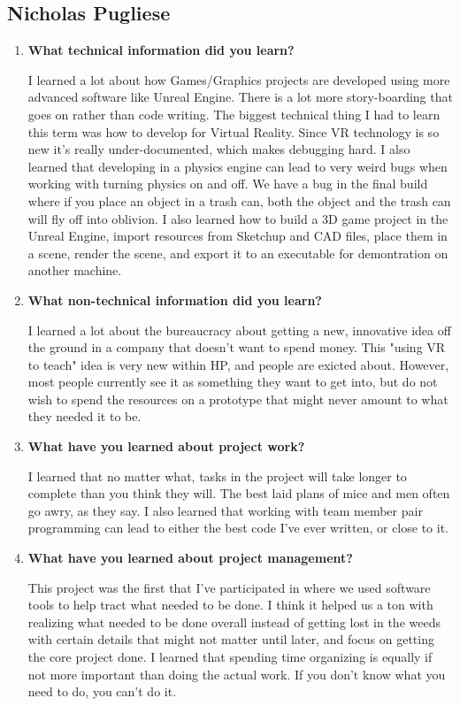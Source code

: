 \documentclass[onecolumn, draftclsnofoot,10pt, compsoc]{IEEEtran}
\begin{document}
\subsection{Nicholas Pugliese}
\begin{enumerate}
    \item \textbf{What technical information did you learn?}
    
    I learned a lot about how Games/Graphics projects are developed using more advanced software like Unreal Engine. There is a lot more story-boarding that goes on rather than code writing. The biggest technical thing I had to learn this term was how to develop for Virtual Reality. Since VR technology is so new it's really under-documented, which makes debugging hard. I also learned that developing in a physics engine can lead to very weird bugs when working with turning physics on and off. We have a bug in the final build where if you place an object in a trash can, both the object and the trash can will fly off into oblivion. I also learned how to build a 3D game project in the Unreal Engine, import resources from Sketchup and CAD files, place them in a scene, render the scene, and export it to an executable for demontration on another machine.
    
    \item \textbf{What non-technical information did you learn?}
    
    I learned a lot about the bureaucracy about getting a new, innovative idea off the ground in a company that doesn't want to spend money. This "using VR to teach" idea is very new within HP, and people are exicted about. However, most people currently see it as something they want to get into, but do not wish to spend the resources on a prototype that might never amount to what they needed it to be.
    
    \item \textbf{What have you learned about project work?}
    
    I learned that no matter what, tasks in the project will take longer to complete than you think they will. The best laid plans of mice and men often go awry, as they say. I also learned that working with team member pair programming can lead to either the best code I've ever written, or close to it.
    
    \item \textbf{What have you learned about project management?}
    
    This project was the first that I've participated in where we used software tools to help tract what needed to be done. I think it helped us a ton with realizing what needed to be done overall instead of getting lost in the weeds with certain details that might not matter until later, and focus on getting the core project done. I learned that spending time organizing is equally if not more important than doing the actual work. If you don't know what you need to do, you can't do it.
    

\end{enumerate}
\end{document}
